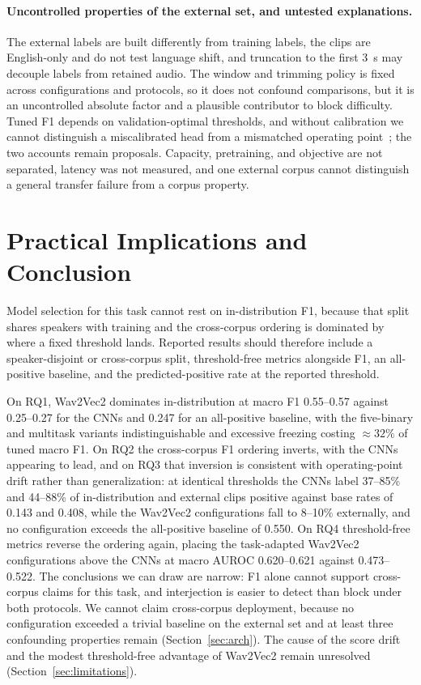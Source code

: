 \documentclass[a4paper,orivec]{llncs}
\begin{document}
\paragraph{Uncontrolled properties of the external set, and untested
explanations.} The external labels are built differently from training labels,
the clips are English-only and do not test language shift, and truncation to the
first 3~s may decouple labels from retained audio. The window and trimming policy
is fixed across configurations and protocols, so it does not confound comparisons,
but it is an uncontrolled absolute factor and a plausible contributor to block
difficulty. Tuned F1 depends on validation-optimal thresholds, and without
calibration we cannot distinguish a miscalibrated head from a mismatched operating
point~\cite{guo2017calibration}; the two accounts remain proposals. Capacity,
pretraining, and objective are not separated, latency was not measured, and one
external corpus cannot distinguish a general transfer failure from a corpus
property.

\section{Practical Implications and Conclusion}
\label{sec:conclusion}
Model selection for this task cannot rest on in-distribution F1, because that
split shares speakers with training and the cross-corpus ordering is dominated by
where a fixed threshold lands. Reported results should therefore include a
speaker-disjoint or cross-corpus split, threshold-free metrics alongside F1, an
all-positive baseline, and the predicted-positive rate at the reported threshold.

On RQ1, Wav2Vec2 dominates in-distribution at macro F1 0.55--0.57 against
0.25--0.27 for the CNNs and 0.247 for an all-positive baseline, with the
five-binary and multitask variants indistinguishable and excessive freezing
costing ${\approx}32\%$ of tuned macro F1. On RQ2 the cross-corpus F1 ordering
inverts, with the CNNs appearing to lead, and on RQ3 that inversion is consistent
with operating-point drift rather than generalization: at identical thresholds the
CNNs label 37--85\% and 44--88\% of in-distribution and external clips positive
against base rates of 0.143 and 0.408, while the Wav2Vec2 configurations fall to
8--10\% externally, and no configuration exceeds the all-positive baseline of
0.550. On RQ4 threshold-free metrics reverse the ordering again, placing the
task-adapted Wav2Vec2 configurations above the CNNs at macro AUROC 0.620--0.621
against 0.473--0.522. The conclusions we can draw are narrow: F1 alone cannot
support cross-corpus claims for this task, and interjection is easier to detect
than block under both protocols. We cannot claim cross-corpus deployment, because
no configuration exceeded a trivial baseline on the external set and at least
three confounding properties remain (Section~\ref{sec:arch}). The cause of the
score drift and the modest threshold-free advantage of Wav2Vec2 remain unresolved
(Section~\ref{sec:limitations}).
\end{document}
